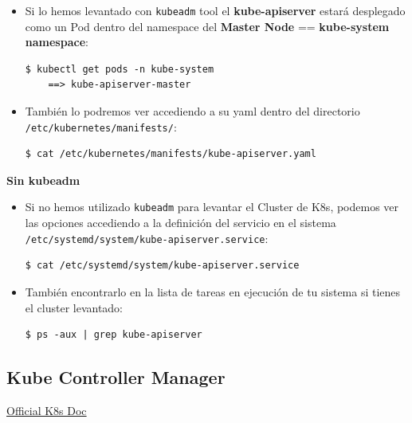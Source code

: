 \documentclass{article}
\newenvironment{codetemplate}[1][]{%
  \mybasecolorbox[#1]
  \itshape
}{%
  \endmybasecolorbox
}
\begin{document}
\begin{itemize}
    \item Si lo hemos levantado con \verb|kubeadm| tool el \textbf{kube-apiserver} estará desplegado como un Pod dentro del namespace del \textbf{Master Node} == \textbf{kube-system namespace}:
\begin{codetemplate}{}
\begin{verbatim}
$ kubectl get pods -n kube-system
    ==> kube-apiserver-master
\end{verbatim}
\end{codetemplate}

     \item También lo podremos ver accediendo a su yaml dentro del directorio \verb|/etc/kubernetes/manifests/|:
\begin{codetemplate}{}
\begin{verbatim}
$ cat /etc/kubernetes/manifests/kube-apiserver.yaml
\end{verbatim}
\end{codetemplate}
\end{itemize}

\textbf{Sin kubeadm}
\begin{itemize}
    \item Si no hemos utilizado \verb|kubeadm| para levantar el Cluster de K8s, podemos ver las opciones accediendo a la definición del servicio en el sistema \verb|/etc/systemd/system/kube-apiserver.service|:
\begin{codetemplate}{}
\begin{verbatim}
$ cat /etc/systemd/system/kube-apiserver.service
\end{verbatim}
\end{codetemplate}

    \item También encontrarlo en la lista de tareas en ejecución de tu sistema si tienes el cluster levantado:
\begin{codetemplate}{}
\begin{verbatim}
$ ps -aux | grep kube-apiserver
\end{verbatim}
\end{codetemplate}
\end{itemize}

\subsection{Kube Controller Manager}

\href{https://kubernetes.io/docs/reference/command-line-tools-reference/kube-controller-manager/}{Official K8s Doc}
\end{document}
